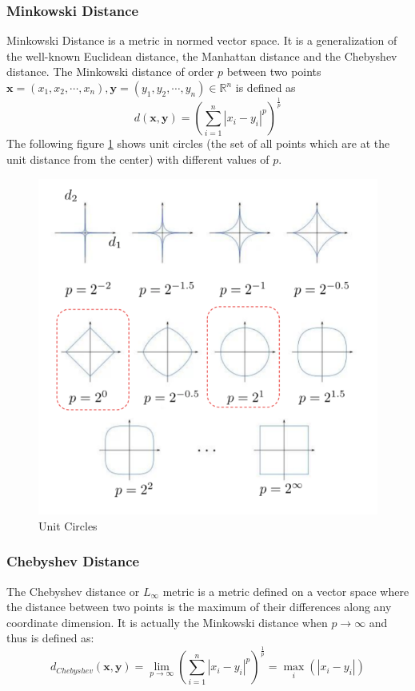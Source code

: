 \documentclass[conference]{IEEEtran}
\begin{document}
\subsubsection{Minkowski Distance}
\par
Minkowski Distance is a metric in normed vector space. It is a generalization of the well-known Euclidean distance, the Manhattan distance and the Chebyshev distance.
The Minkowski distance of order $p$ between two points $\mathbf{x}=(x_1,x_2,\cdots,x_n), \mathbf{y}=(y_1,y_2,\cdots,y_n) \in \mathbb{R}^n$ is defined as
\begin{equation}
    d(\mathbf{x}, \mathbf{y})=\left(\sum_{i=1}^{n}\left|x_{i}-y_{i}\right|^{p}\right)^{\frac{1}{p}}
\end{equation}
The following figure \ref{fig:mkd} shows unit circles (the set of all points which are at the unit distance from the center) with different values of $p$.
\begin{figure}[htbp]
	\centering
	\includegraphics[scale=0.3]{pic/minkowski.png}
	\caption{Unit Circles}
	\label{fig:mkd}
\end{figure}
\subsubsection{Chebyshev Distance}
\par
The Chebyshev distance or $L_{\infty}$ metric is a metric defined on a vector space where the distance between two points is the maximum of their differences along any coordinate dimension.\cite{hmds}
It is actually the Minkowski distance when $p\rightarrow\infty$ and thus is defined as:
\begin{equation}
    d_{Chebyshev}(\mathbf{x},\mathbf{y})=\lim_{p\rightarrow\infty}\left(\sum_{i=1}^{n}\left|x_{i}-y_{i}\right|^{p}\right)^{\frac{1}{p}}=\max_{i}(|x_i-y_i|)
\end{equation}
\end{document}

